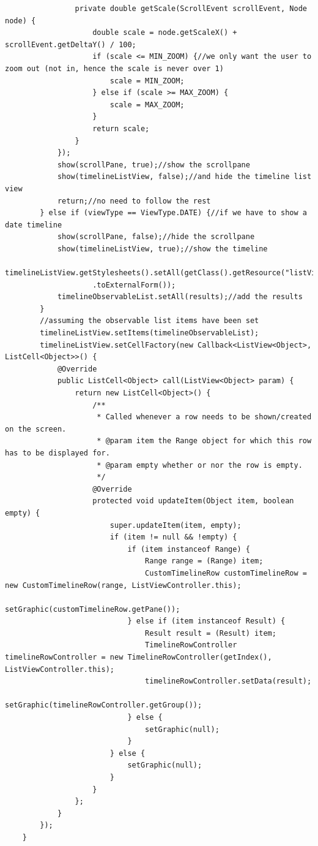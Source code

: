 \begin{lstlisting}
                private double getScale(ScrollEvent scrollEvent, Node node) {
                    double scale = node.getScaleX() + scrollEvent.getDeltaY() / 100;
                    if (scale <= MIN_ZOOM) {//we only want the user to zoom out (not in, hence the scale is never over 1)
                        scale = MIN_ZOOM;
                    } else if (scale >= MAX_ZOOM) {
                        scale = MAX_ZOOM;
                    }
                    return scale;
                }
            });
            show(scrollPane, true);//show the scrollpane
            show(timelineListView, false);//and hide the timeline list view
            return;//no need to follow the rest
        } else if (viewType == ViewType.DATE) {//if we have to show a date timeline
            show(scrollPane, false);//hide the scrollpane
            show(timelineListView, true);//show the timeline
            timelineListView.getStylesheets().setAll(getClass().getResource("listViewTheme.css")
            		.toExternalForm());
            timelineObservableList.setAll(results);//add the results
        }
        //assuming the observable list items have been set
        timelineListView.setItems(timelineObservableList);
        timelineListView.setCellFactory(new Callback<ListView<Object>, ListCell<Object>>() {
            @Override
            public ListCell<Object> call(ListView<Object> param) {
                return new ListCell<Object>() {
                    /**
                     * Called whenever a row needs to be shown/created on the screen.
                     * @param item the Range object for which this row has to be displayed for.
                     * @param empty whether or nor the row is empty.
                     */
                    @Override
                    protected void updateItem(Object item, boolean empty) {
                        super.updateItem(item, empty);
                        if (item != null && !empty) {
                            if (item instanceof Range) {
                                Range range = (Range) item;
                                CustomTimelineRow customTimelineRow = new CustomTimelineRow(range, ListViewController.this);
                                setGraphic(customTimelineRow.getPane());
                            } else if (item instanceof Result) {
                                Result result = (Result) item;
                                TimelineRowController timelineRowController = new TimelineRowController(getIndex(), ListViewController.this);
                                timelineRowController.setData(result);
                                setGraphic(timelineRowController.getGroup());
                            } else {
                                setGraphic(null);
                            }
                        } else {
                            setGraphic(null);
                        }
                    }
                };
            }
        });
    }


\end{lstlisting}
